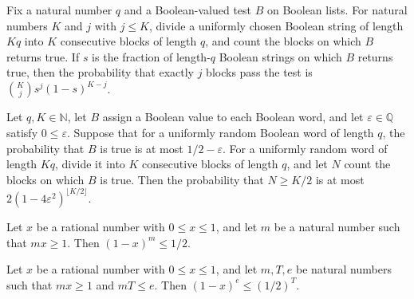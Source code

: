 \begin{theorem}
\label{Randomized.randProb_blockCount}
\leanok
{}
Fix a natural number $q$ and a Boolean-valued test $B$ on Boolean lists. For natural
numbers $K$ and $j$ with $j\le K$, divide a uniformly chosen Boolean string of length
$Kq$ into $K$ consecutive blocks of length $q$, and count the blocks on which $B$
returns true. If $s$ is the fraction of length-$q$ Boolean strings on which $B$ returns
true, then the probability that exactly $j$ blocks pass the test is $\binom Kj
s^j(1-s)^{K-j}$.
\end{theorem}

\begin{theorem}
\label{Randomized.randProb_tail_le}
\leanok
{}
Let $q,K\in\mathbb N$, let $B$ assign a Boolean value to each Boolean word, and let
$\varepsilon\in\mathbb Q$ satisfy $0\le\varepsilon$. Suppose that for a uniformly random
Boolean word of length $q$, the probability that $B$ is true is at most
$1/2-\varepsilon$. For a uniformly random word of length $Kq$, divide it into $K$
consecutive blocks of length $q$, and let $N$ count the blocks on which $B$ is true.
Then the probability that $N\ge K/2$ is at most $2(1-4\varepsilon^2)^{\lfloor
K/2\rfloor}$.
\end{theorem}

\begin{theorem}
\label{Randomized.one_sub_pow_le_half}
\leanok
{}
Let $x$ be a rational number with $0 \le x \le 1$, and let $m$ be a natural number such
that $mx \ge 1$. Then $(1-x)^m \le 1/2$.
\end{theorem}

\begin{theorem}
\label{Randomized.one_sub_pow_le_half_pow}
\leanok
{}
Let $x$ be a rational number with $0 \le x \le 1$, and let $m,T,e$ be natural numbers
such that $mx \ge 1$ and $mT \le e$. Then $(1-x)^e \le (1/2)^T$.
\end{theorem}

